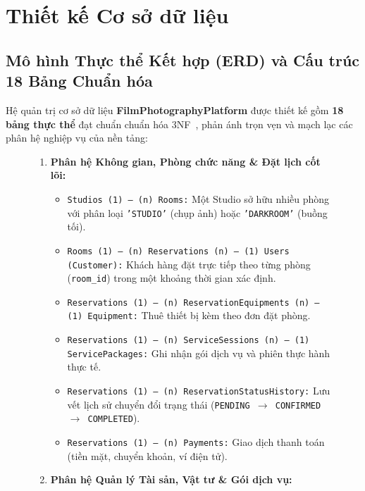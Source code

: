 \section{Thiết kế Cơ sở dữ liệu}

\subsection{Mô hình Thực thể Kết hợp (ERD) và Cấu trúc 18 Bảng Chuẩn hóa}
Hệ quản trị cơ sở dữ liệu \textbf{FilmPhotographyPlatform} được thiết kế gồm \textbf{18 bảng thực thể} đạt chuẩn chuẩn hóa 3NF~\cite{silberschatz2020database}, phản ánh trọn vẹn và mạch lạc các phân hệ nghiệp vụ của nền tảng:

\begin{figure}[H]
\centering
\begin{tcolorbox}[colback=gray!5!white,colframe=gray!75!black,title=\textbf{PHÂN HỆ 18 THỰC THỂ TRONG HỆ THỐNG FILMPHOTOGRAPHYPLATFORM},top=2pt,bottom=2pt]
\begin{enumerate}[leftmargin=1.2em,itemsep=0pt,parsep=0pt,topsep=2pt]
    \item \textbf{Phân hệ Không gian, Phòng chức năng \& Đặt lịch cốt lõi:}
    \begin{itemize}[leftmargin=1em,itemsep=0pt,parsep=0pt]
        \item \texttt{Studios (1) --- (n) Rooms:} Một Studio sở hữu nhiều phòng với phân loại \texttt{'STUDIO'} (chụp ảnh) hoặc \texttt{'DARKROOM'} (buồng tối).
        \item \texttt{Rooms (1) --- (n) Reservations (n) --- (1) Users (Customer):} Khách hàng đặt trực tiếp theo từng phòng (\texttt{room\_id}) trong một khoảng thời gian xác định.
        \item \texttt{Reservations (1) --- (n) ReservationEquipments (n) --- (1) Equipment:} Thuê thiết bị kèm theo đơn đặt phòng.
        \item \texttt{Reservations (1) --- (n) ServiceSessions (n) --- (1) ServicePackages:} Ghi nhận gói dịch vụ và phiên thực hành thực tế.
        \item \texttt{Reservations (1) --- (n) ReservationStatusHistory:} Lưu vết lịch sử chuyển đổi trạng thái (\texttt{PENDING $\rightarrow$ CONFIRMED $\rightarrow$ COMPLETED}).
        \item \texttt{Reservations (1) --- (n) Payments:} Giao dịch thanh toán (tiền mặt, chuyển khoản, ví điện tử).
    \end{itemize}
    \item \textbf{Phân hệ Quản lý Tài sản, Vật tư \& Gói dịch vụ:}

\end{enumerate}
\end{tcolorbox}
\end{figure}
